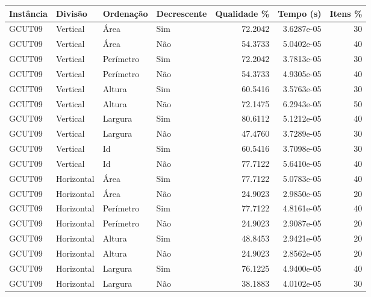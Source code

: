 \begin{tabular}{llllrrr}
    \hline
    Instância & Divisão     & Ordenação & Decrescente & Qualidade \% & Tempo (s)  & Itens \% \\
    \hline
    GCUT09    & Vertical    & Área      & Sim         & 72.2042      & 3.6287e-05 & 30       \\
    GCUT09    & Vertical    & Área      & Não         & 54.3733      & 5.0402e-05 & 40       \\
    GCUT09    & Vertical    & Perímetro & Sim         & 72.2042      & 3.7813e-05 & 30       \\
    GCUT09    & Vertical    & Perímetro & Não         & 54.3733      & 4.9305e-05 & 40       \\
    GCUT09    & Vertical    & Altura    & Sim         & 60.5416      & 3.5763e-05 & 30       \\
    GCUT09    & Vertical    & Altura    & Não         & 72.1475      & 6.2943e-05 & 50       \\
    GCUT09    & Vertical    & Largura   & Sim         & 80.6112      & 5.1212e-05 & 40       \\
    GCUT09    & Vertical    & Largura   & Não         & 47.4760      & 3.7289e-05 & 30       \\
    GCUT09    & Vertical    & Id        & Sim         & 60.5416      & 3.7098e-05 & 30       \\
    GCUT09    & Vertical    & Id        & Não         & 77.7122      & 5.6410e-05 & 40       \\
    GCUT09    & Horizontal  & Área      & Sim         & 77.7122      & 5.0783e-05 & 40       \\
    GCUT09    & Horizontal  & Área      & Não         & 24.9023      & 2.9850e-05 & 20       \\
    GCUT09    & Horizontal  & Perímetro & Sim         & 77.7122      & 4.8161e-05 & 40       \\
    GCUT09    & Horizontal  & Perímetro & Não         & 24.9023      & 2.9087e-05 & 20       \\
    GCUT09    & Horizontal  & Altura    & Sim         & 48.8453      & 2.9421e-05 & 20       \\
    GCUT09    & Horizontal  & Altura    & Não         & 24.9023      & 2.8562e-05 & 20       \\
    GCUT09    & Horizontal  & Largura   & Sim         & 76.1225      & 4.9400e-05 & 40       \\
    GCUT09    & Horizontal  & Largura   & Não         & 38.1883      & 4.0102e-05 & 30       \\

\end{tabular}

